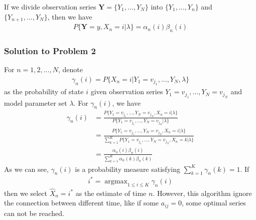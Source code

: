 \documentclass[runningheads]{llncs}
\begin{document}
\par
If we divide observation series $\mathbf{Y} = \{ Y_1,..., Y_N \}$
into $\{ Y_1,..., Y_n \}$ and \\ $\{ Y_{n+1},..., Y_N \}$, then we have
\begin{align}
    P \{ \mathbf{Y} = y, X_n = i | \lambda \} = \alpha_n(i) \beta_n(i)
\end{align}

\subsubsection{Solution to Problem 2}
For $n = 1, 2,..., N$, denote
\begin{align}
    \gamma_n(i) = P \{ X_n = i | Y_1 = v_{j_1}, ..., Y_N, \lambda \}
\end{align}
as the probability of state $i$ given observation series
$Y_1 = v_{j_1},...,Y_N = v_{j_N}$ and model parameter set $\lambda$.
For $\gamma_n(i)$, we have
\begin{align}
    \gamma_n(i) &= \frac{P \{Y_1 = v_{j_1},...,Y_N = v_{j_N}, X_n = i | \lambda \}}{P \{Y_1 = v_{j_1},...,Y_N = v_{j_N}| \lambda \}} \\
    &= \frac{P \{Y_1 = v_{j_1},...,Y_N = v_{j_N}, X_n = i | \lambda \}}{\sum_{k=1}^K P \{Y_1 = v_{j_1},...,Y_N = v_{j_N}, X_n = k | \lambda \}} \\
    &= \frac{\alpha_n(i) \beta_n(i)}{\sum_{k=1}^K \alpha_n(k) \beta_n(k)}
\end{align}
As we can see, $\gamma_n(i)$ is a probability measure satisfying $\sum_{k=1}^K \gamma_n(k) = 1$.
If
\begin{align}
    i^* = \mathop{\arg\max}_{1 \leq i \leq K} \gamma_n(i)
\end{align}
then we select $\hat{X}_n = i^*$ as the estimate of time $n$.
However, this algorithm ignore the connection between different time,
like if some $a_{ij} = 0$, some optimal series can not be reached.
\end{document}
